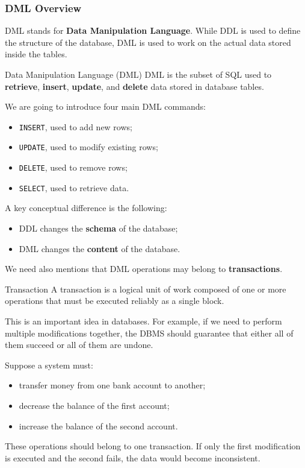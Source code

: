  \subsubsection{DML Overview}

 DML stands for \textbf{Data Manipulation Language}. While DDL is used to define the structure of the database, DML is used to work on the actual data stored inside the tables.

 \begin{defbox}{Data Manipulation Language (DML)}
  DML is the subset of SQL used to \textbf{retrieve}, \textbf{insert}, \textbf{update}, and \textbf{delete} data stored in database tables.
 \end{defbox}

 We are going to introduce four main DML commands:
 \begin{itemize}
  \item \texttt{INSERT}, used to add new rows;
  \item \texttt{UPDATE}, used to modify existing rows;
  \item \texttt{DELETE}, used to remove rows;
  \item \texttt{SELECT}, used to retrieve data.
 \end{itemize}

 A key conceptual difference is the following:
 \begin{itemize}
  \item DDL changes the \textbf{schema} of the database;
  \item DML changes the \textbf{content} of the database.
 \end{itemize}

 We need also mentions that DML operations may belong to \textbf{transactions}.

 \begin{defbox}{Transaction}
  A transaction is a logical unit of work composed of one or more operations that must be executed reliably as a single block.
 \end{defbox}

 This is an important idea in databases. For example, if we need to perform multiple modifications together, the DBMS should guarantee that either all of them succeed or all of them are undone.

 \begin{example}
  Suppose a system must:
  \begin{itemize}
   \item transfer money from one bank account to another;
   \vspace{0.2cm}
   \item decrease the balance of the first account;
   \vspace{0.2cm}
   \item increase the balance of the second account.
  \end{itemize}

  These operations should belong to one transaction. If only the first modification is executed and the second fails, the data would become inconsistent.
 \end{example}

